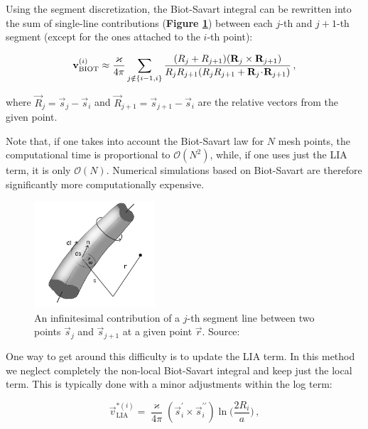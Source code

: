Using the segment discretization, the Biot-Savart integral can be rewritten \cite{samuels} into the sum of single-line contributions (\textbf{Figure \ref{element}}) between each $j$-th and $j+1$-th segment (except for the ones attached to the $i$-th point):

\begin{equation}
\mathbf{v}_{\text{BIOT}}^{(i)} \approx
\frac{\varkappa}{4\pi}
\sum_{j \notin \{i-1, i\}}
\frac{(R_j + R_{j+1}) (\mathbf{R}_j \times \mathbf{R}_{j+1})}{R_j R_{j+1} (R_j R_{j+1} + \mathbf{R}_j \!\cdot\! \mathbf{R}_{j+1})}\,,
\end{equation}

where $\vec{R}_j = \vec{s}_j - \vec{s}_i$ and $\vec{R}_{j+1} = \vec{s}_{j+1} - \vec{s}_i$ are the relative vectors from the given point.

Note that, if one takes into account the Biot-Savart law for $N$ mesh points, the computational time is proportional to $\mathcal{O}(N^2)$, while, if one uses just the LIA term, it is only $\mathcal{O}(N)$. Numerical simulations based on Biot-Savart are therefore significantly more computationally expensive.

\begin{figure}[h]
	\centering
	\includegraphics[width=0.4\textwidth]{graphics/simul/biot}
	\caption{An infinitesimal contribution of a $j$-th segment line between two points $\vec{s}_j$ and $\vec{s}_{j+1}$ at a given point $\vec{r}$. Source: \cite{element}}
	\label{element}
\end{figure}

One way to get around this difficulty is to update the LIA term. In this method we neglect completely the non-local Biot-Savart integral and keep just the local term. This is typically done with a minor adjustments within the log term:

\begin{equation}
\vec{v}_{\text{LIA}}^{*(i)} =
\frac{\varkappa}{4\pi} (\vec{s}^{\prime}_i \times \vec{s}^{\prime \prime}_i)
\ln{\Bigg(\frac{2 R_i}{a}\Bigg)}\,,
\label{LIAnew}
\end{equation}

